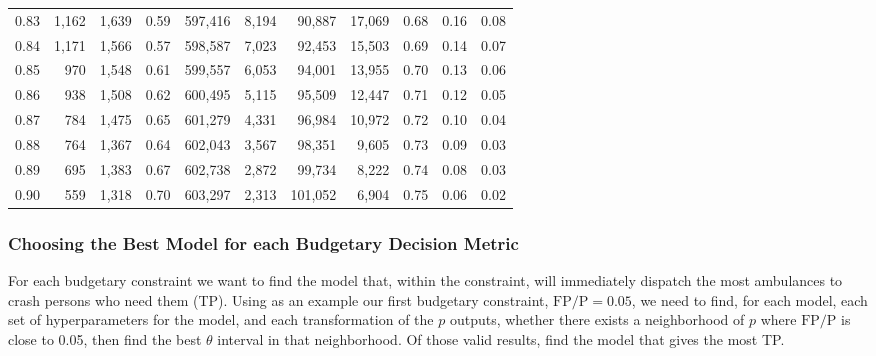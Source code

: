 \begin{table}[h]
\begin{tabular}{
	*{3}{>{\normalfont\normalsize}r}
	*{1}{>{\normalfont\normalsize}c}
	*{7}{>{\normalfont\normalsize}r}
}
0.83 &   1,162 &  1,639 &                                       0.59 &  597,416 &    8,194 &   90,887 &   17,069 &  0.68 &  0.16 &                         0.08 \\
0.84 &   1,171 &  1,566 &                                       0.57 &  598,587 &    7,023 &   92,453 &   15,503 &  0.69 &  0.14 &                         0.07 \\
0.85 &     970 &  1,548 &                                       0.61 &  599,557 &    6,053 &   94,001 &   13,955 &  0.70 &  0.13 &                         0.06 \\
0.86 &     938 &  1,508 &                                       0.62 &  600,495 &    5,115 &   95,509 &   12,447 &  0.71 &  0.12 &                         0.05 \\
0.87 &     784 &  1,475 &                                       0.65 &  601,279 &    4,331 &   96,984 &   10,972 &  0.72 &  0.10 &                         0.04 \\
0.88 &     764 &  1,367 &                                       0.64 &  602,043 &    3,567 &   98,351 &    9,605 &  0.73 &  0.09 &                         0.03 \\
0.89 &     695 &  1,383 &                                       0.67 &  602,738 &    2,872 &   99,734 &    8,222 &  0.74 &  0.08 &                         0.03 \\
0.90 &     559 &  1,318 &                                       0.70 &  603,297 &    2,313 &  101,052 &    6,904 &  0.75 &  0.06 &                         0.02 \\
\bottomrule
\end{tabular}
\end{table}

\FloatBarrier

\subsubsection{Choosing the Best Model for each Budgetary Decision Metric}
\label{choosing_model}

For each budgetary constraint we want to find the model that, within the constraint, will immediately dispatch the most ambulances to crash persons who need them (TP).  Using as an example our first budgetary constraint, $\text{FP}/\text{P} = 0.05$, we need to find, for each model, each set of hyperparameters for the model, and each transformation of the $p$ outputs, whether there exists a neighborhood of $p$ where $\text{FP}/\text{P}$ is close to 0.05, then find the best $\theta$ interval in that neighborhood.  Of those valid results, find the model that gives the most TP.  


